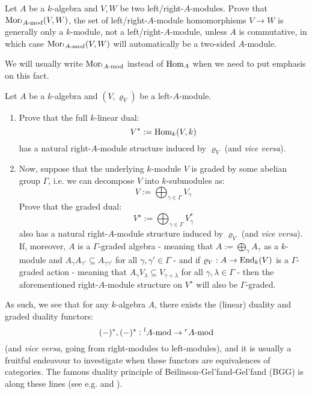         \begin{question}
            Let $A$ be a $k$-algebra and $V, W$ be two left/right-$A$-modules. Prove that $\Mor_{ {}^lA\mod }(V, W)$, the set of left/right-$A$-module homomorphisms $V \to W$ is generally only a $k$-module, not a left/right-$A$-module, unless $A$ is commutative, in which case $\Mor_{ {}^lA\mod }(V, W)$ will automatically be a two-sided $A$-module.

            We will usually write $\Mor_{ {}^lA\mod }$ instead of $\Hom_A$ when we need to put emphasis on this fact. 
        \end{question}
        \begin{question}
            Let $A$ be a $k$-algebra and $(V, \varrho_V)$ be a left-$A$-module.
            \begin{enumerate}
                \item Prove that the full $k$-linear dual:
                    $$V^* := \Hom_k(V, k)$$
                has a natural right-$A$-module structure induced by $\varrho_V$ (and \textit{vice versa}).
                \item Now, suppose that the underlying $k$-module $V$ is graded by some abelian group $\Gamma$, i.e. we can decompose $V$ into $k$-submodules as:
                    $$V := \bigoplus_{\gamma \in \Gamma} V_{\gamma}$$
                Prove that the graded dual:
                    $$V^{\star} := \bigoplus_{\gamma \in \Gamma} V_{\gamma}^*$$
                also has a natural right-$A$-module structure induced by $\varrho_V$ (and \textit{vice versa}). If, moreover, $A$ is a $\Gamma$-graded algebra - meaning that $A := \bigoplus_{\gamma} A_{\gamma}$ as a $k$-module and $A_{\gamma} A_{\gamma'} \subseteq A_{\gamma \gamma'}$ for all $\gamma, \gamma' \in \Gamma$ - and if $\varrho_V: A \to \End_k(V)$ is a $\Gamma$-graded action - meaning that $A_{\gamma} V_{\lambda} \subseteq V_{\gamma + \lambda}$ for all $\gamma, \lambda \in \Gamma$ - then the aforementioned right-$A$-module structure on $V^{\star}$ will also be $\Gamma$-graded.
            \end{enumerate}
        \end{question}
        As such, we see that for any $k$-algebra $A$, there exists the (linear) duality and graded duality functors:
            $$(-)^*, (-)^{\star}: {}^lA\mod \to {}^rA\mod$$
        (and \textit{vice versa}, going from right-modules to left-modules), and it is usually a fruitful endeavour to investigate when these functors are equivalences of categories. The famous duality principle of Beilinson-Gel'fand-Gel'fand (BGG) is along these lines (see e.g. \cite[Chapter 3]{humphreys_category_O} and \cite[Sections 2.6 and 6.7]{moody_pianzola_lie_algebras_with_triangular_decompositions}). 
